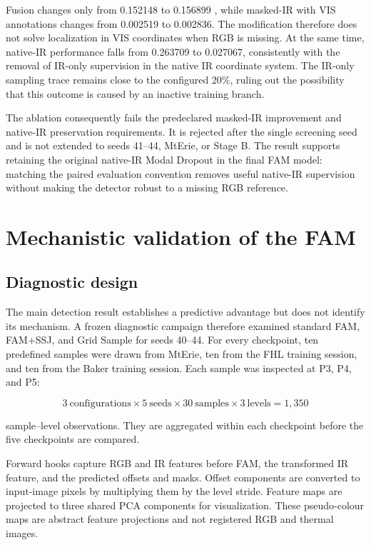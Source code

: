 Fusion changes only from 0.152148 to 0.156899 \mapfifty{}, while masked-IR with
VIS annotations changes from 0.002519 to 0.002836. The modification therefore
does not solve localization in VIS coordinates when RGB is missing. At the
same time, native-IR performance falls from 0.263709 to 0.027067, consistently
with the removal of IR-only supervision in the native IR coordinate system.
The IR-only sampling trace remains close to the configured
20\%, ruling out the possibility that this outcome is caused by an inactive
training branch.

The ablation consequently fails the predeclared masked-IR improvement and
native-IR preservation requirements. It is rejected after the single screening
seed and is not extended to seeds 41--44, MtErie, or Stage B. The result
supports retaining the original native-IR Modal Dropout in the final FAM
model: matching the paired evaluation convention removes useful native-IR
supervision without making the detector robust to a missing RGB reference.

\section{Mechanistic validation of the FAM}
\label{sec:fam-diagnostics}

\subsection{Diagnostic design}

The main detection result establishes a predictive advantage but does not
identify its mechanism. A frozen diagnostic campaign therefore examined
standard FAM, FAM+SSJ, and Grid Sample for seeds 40--44. For every checkpoint,
ten predefined samples were drawn from MtErie, ten from the FHL training
session, and ten from the Baker training session. Each sample was inspected at
P3, P4, and P5:

\begin{equation}
  3\ \text{configurations}\times5\ \text{seeds}\times
  30\ \text{samples}\times3\ \text{levels}=1,350
\end{equation}

sample--level observations. They are aggregated within each checkpoint before
the five checkpoints are compared.

Forward hooks capture RGB and IR features before FAM, the transformed IR
feature, and the predicted offsets and masks. Offset components are converted
to input-image pixels by multiplying them by the level stride. Feature maps are
projected to three shared PCA components for visualization. These pseudo-colour
maps are abstract feature projections and not registered RGB and thermal images.

